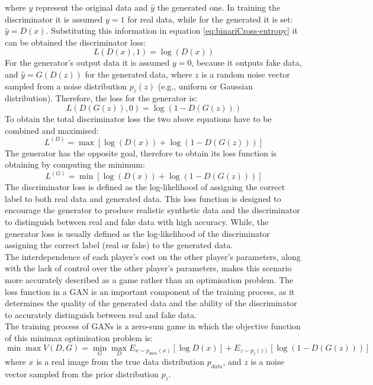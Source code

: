 where $y$ represent the original data and $\hat{y}$ the generated one. In training the discriminator it is assumed $y=1$ for real data, while for the generated it is set: $\hat{y} = D(x)$. Substituting this information in equation \ref{eq:binariCross-entropy} it can be obtained the discriminator loss: 
\begin{equation}
    L(D(x),1)=\log(D(x))
\end{equation}
For the generator's output data it is assumed $y = 0$, because it outputs fake data, and $\hat{y} = G(D(z))$ for the generated data, where $z$ is a random noise vector sampled from a noise distribution $p_z(z)$ (e.g., uniform or Gaussian distribution). Therefore, the loss for the generator is:
\begin{equation}
    L(D(G(z)),0) = \log(1 - D(G(z)))
\end{equation}
To obtain the total discriminator loss the two above equations have to be combined and maximised:
\begin{equation}
L^{(D)}=\max [\log (D(x)) + \log(1-D(G(z)))]
\end{equation}
The generator has the opposite goal, therefore to obtain its loss function is obtaining by computing the minimum:
\begin{equation}
L^{(G)}=\min [\log (D(x)) + \log(1-D(G(z)))]
\end{equation}
The discriminator loss is defined as the log-likelihood of assigning the correct label to both real data and generated data. This loss function is designed to encourage the generator to produce realistic synthetic data and the discriminator to distinguish between real and fake data with high accuracy. While, the generator loss is usually defined as the log-likelihood of the discriminator assigning the correct label (real or fake) to the generated data.
\\
The interdependence of each player's cost on the other player's parameters, along with the lack of control over the other player's parameters, makes this scenario more accurately described as a game rather than an optimisation problem.
The loss function in a GAN is an important component of the training process, as it determines the quality of the generated data and the ability of the discriminator to accurately distinguish between real and fake data. 
\\
\noindent The training process of GANs is a zero-sum game in which the objective function of this minimax optimisation problem is:
\begin{equation}
    \min \max V(D,G) = \min_G \max_D E_{x \sim p_{data}(x)}[\log D(x)]+E_{z \sim p_z(z)}[\log (1- D(G(z)))]
\end{equation}
where $x$ is a real image from the true data distribution $p_{data}$, and $z$ is a noise vector sampled from the prior distribution $p_z$.

